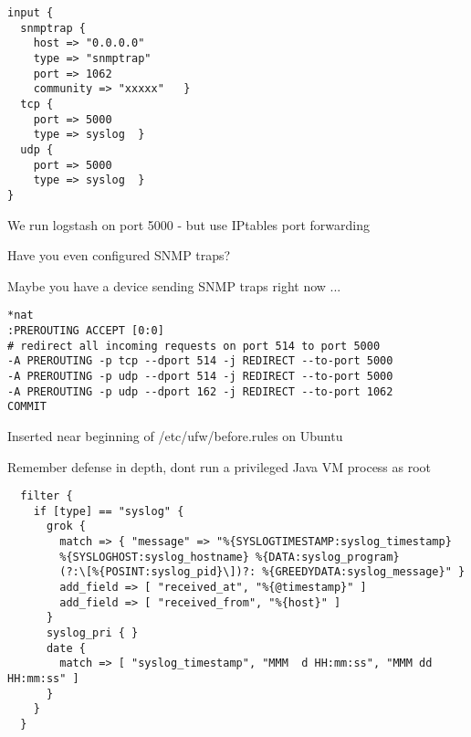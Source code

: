 \documentclass[Screen16to9,17pt]{foils}
\begin{document}



{\footnotesize
\begin{verbatim}
input {
  snmptrap {
    host => "0.0.0.0"
    type => "snmptrap"
    port => 1062
    community => "xxxxx"   }
  tcp {
    port => 5000
    type => syslog  }
  udp {
    port => 5000
    type => syslog  }
}
\end{verbatim}
}

\begin{list2}
\item We run logstash on port 5000 - but use IPtables port forwarding
\item Have you even configured SNMP traps?
\item Maybe you have a device sending SNMP traps right now ...
\end{list2}


{\footnotesize
\begin{verbatim}
*nat
:PREROUTING ACCEPT [0:0]
# redirect all incoming requests on port 514 to port 5000
-A PREROUTING -p tcp --dport 514 -j REDIRECT --to-port 5000
-A PREROUTING -p udp --dport 514 -j REDIRECT --to-port 5000
-A PREROUTING -p udp --dport 162 -j REDIRECT --to-port 1062
COMMIT
\end{verbatim}
}

\centerline{Inserted near beginning of /etc/ufw/before.rules on Ubuntu}

Remember defense in depth, dont run a privileged Java VM process as root \smiley


{\footnotesize
\begin{verbatim}
  filter {
    if [type] == "syslog" {
      grok {
        match => { "message" => "%{SYSLOGTIMESTAMP:syslog_timestamp}
        %{SYSLOGHOST:syslog_hostname} %{DATA:syslog_program}
        (?:\[%{POSINT:syslog_pid}\])?: %{GREEDYDATA:syslog_message}" }
        add_field => [ "received_at", "%{@timestamp}" ]
        add_field => [ "received_from", "%{host}" ]
      }
      syslog_pri { }
      date {
        match => [ "syslog_timestamp", "MMM  d HH:mm:ss", "MMM dd HH:mm:ss" ]
      }
    }
  }
\end{verbatim}
}
\end{document}
